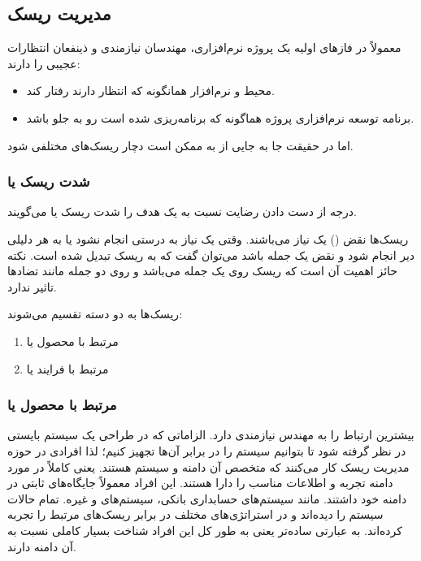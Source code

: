 \subsection{مدیریت ریسک}

معمولاً در فاز‌های اولیه یک پروژه نرم‌افزاری، مهندسان نیازمندی و ذینفعان
انتظارات عجیبی را دارند:

\begin{itemize}
    \item محیط و نرم‌افزار همانگونه که انتظار دارند رفتار کند.
    \item برنامه توسعه نرم‌افزاری پروژه هماگونه که برنامه‌ریزی شده است رو به جلو
    باشد.
\end{itemize}

اما در حقیقت جا به جایی از  به  ممکن است دچار
ریسک‌های مختلفی شود.

\subsubsection{شدت ریسک یا }

درجه از دست دادن رضایت نسبت به یک هدف را شدت ریسک یا  می‌گویند.

ریسک‌ها نقض () یک نیاز می‌باشند. وقتی یک نیاز به درستی انجام نشود یا به
هر دلیلی دیر انجام شود و نقض یک جمله باشد می‌توان گفت که به ریسک تبدیل شده است.
نکته حائز اهمیت آن است که ریسک روی یک جمله می‌باشد و روی دو جمله مانند تضاد‌ها
تاثیر ندارد.

ریسک‌ها به دو دسته تقسیم می‌شوند:

\begin{enumerate}
    \item مرتبط با محصول یا 
    \item مرتبط با فرایند یا 
\end{enumerate}

\subsubsection{مرتبط با محصول یا }

بیشترین ارتباط را به مهندس نیازمندی دارد. الزاماتی که در طراحی یک سیستم بایستی
در نظر گرفته شود تا بتوانیم سیستم را در برابر آن‌ها تجهیز کنیم؛ لذا افرادی در
حوزه مدیریت ریسک کار می‌کنند که متخصص آن دامنه و سیستم هستند. یعنی کاملاً در
مورد دامنه تجربه و اطلاعات مناسب را دارا هستند. این افراد معمولاً جایگاه‌های
ثابتی در دامنه خود داشتند. مانند سیستم‌های حسابداری بانکی، سیستم‌های  و
غیره. تمام حالات سیستم را دیده‌اند و در استراتژی‌های مختلف در برابر ریسک‌های
مرتبط را تجربه کرده‌اند. به عبارتی ساده‌تر یعنی به طور کل این افراد شناخت بسیار
کاملی نسبت به آن دامنه دارند.

